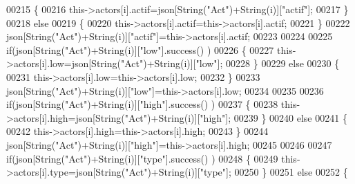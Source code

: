 \begin{DoxyCode}
00215                         \{
00216                             this->actors[i].actif=json[String(\textcolor{stringliteral}{"Act"})+String(i)][\textcolor{stringliteral}{"actif"}];
00217                         \}
00218                         \textcolor{keywordflow}{else}
00219                         \{
00220                             this->actors[i].actif=this->actors[i].actif;
00221                         \}
00222                         json[String(\textcolor{stringliteral}{"Act"})+String(i)][\textcolor{stringliteral}{"actif"}]=this->actors[i].actif;
00223 
00224 
00225                         \textcolor{keywordflow}{if}(json[String(\textcolor{stringliteral}{"Act"})+String(i)][\textcolor{stringliteral}{"low"}].success() )
00226                         \{                   
00227                             this->actors[i].low=json[String(\textcolor{stringliteral}{"Act"})+String(i)][\textcolor{stringliteral}{"low"}];
00228                         \}
00229                         \textcolor{keywordflow}{else}
00230                         \{
00231                             this->actors[i].low=this->actors[i].low;                    
00232                         \}
00233                         json[String(\textcolor{stringliteral}{"Act"})+String(i)][\textcolor{stringliteral}{"low"}]=this->actors[i].low;
00234     
00235                     
00236                         \textcolor{keywordflow}{if}(json[String(\textcolor{stringliteral}{"Act"})+String(i)][\textcolor{stringliteral}{"high"}].success() )
00237                         \{               
00238                             this->actors[i].high=json[String(\textcolor{stringliteral}{"Act"})+String(i)][\textcolor{stringliteral}{"high"}];
00239                         \}
00240                         \textcolor{keywordflow}{else}
00241                         \{
00242                             this->actors[i].high=this->actors[i].high;
00243                         \}
00244                         json[String(\textcolor{stringliteral}{"Act"})+String(i)][\textcolor{stringliteral}{"high"}]=this->actors[i].high;
00245 
00246                     
00247                         \textcolor{keywordflow}{if}(json[String(\textcolor{stringliteral}{"Act"})+String(i)][\textcolor{stringliteral}{"type"}].success() )
00248                         \{               
00249                             this->actors[i].type=json[String(\textcolor{stringliteral}{"Act"})+String(i)][\textcolor{stringliteral}{"type"}]; 
00250                         \}
00251                         \textcolor{keywordflow}{else}
00252                         \{

\end{DoxyCode}

